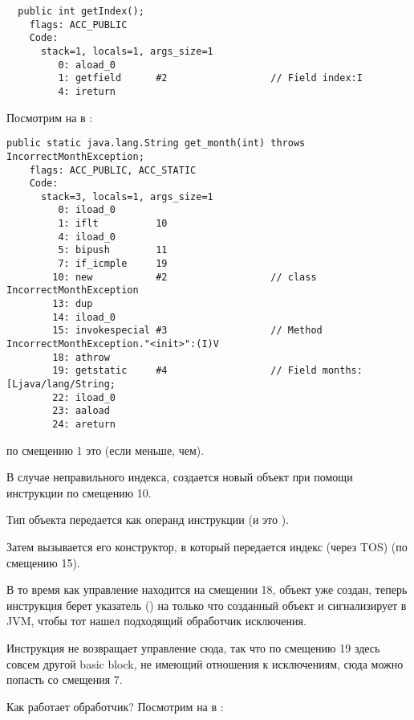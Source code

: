 \begin{lstlisting}
  public int getIndex();
    flags: ACC_PUBLIC
    Code:
      stack=1, locals=1, args_size=1
         0: aload_0       
         1: getfield      #2                  // Field index:I
         4: ireturn       
\end{lstlisting}

Посмотрим на  в :

\begin{lstlisting}[caption=Month2.class]
  public static java.lang.String get_month(int) throws IncorrectMonthException;
    flags: ACC_PUBLIC, ACC_STATIC
    Code:
      stack=3, locals=1, args_size=1
         0: iload_0       
         1: iflt          10
         4: iload_0       
         5: bipush        11
         7: if_icmple     19
        10: new           #2                  // class IncorrectMonthException
        13: dup           
        14: iload_0       
        15: invokespecial #3                  // Method IncorrectMonthException."<init>":(I)V
        18: athrow        
        19: getstatic     #4                  // Field months:[Ljava/lang/String;
        22: iload_0       
        23: aaload        
        24: areturn       
\end{lstlisting}

 по смещению 1 это  (если меньше, чем).

В случае неправильного индекса, создается новый объект при помощи инструкции  
по смещению 10.

Тип объекта передается как операнд инструкции (и это ).

Затем вызывается его конструктор, в который передается индекс (через \ac{TOS}) (по смещению 15).

В то время как управление находится на смещении 18, объект уже создан,
теперь инструкция  берет указатель ()
на только что созданный объект и сигнализирует в \ac{JVM}, чтобы тот нашел подходящий обработчик
исключения.

Инструкция  не возвращает управление сюда,
так что по смещению 19 здесь совсем другой \gls{basic block},
не имеющий отношения к исключениям, сюда можно попасть со смещения 7.

Как работает обработчик?
Посмотрим на \main в :

